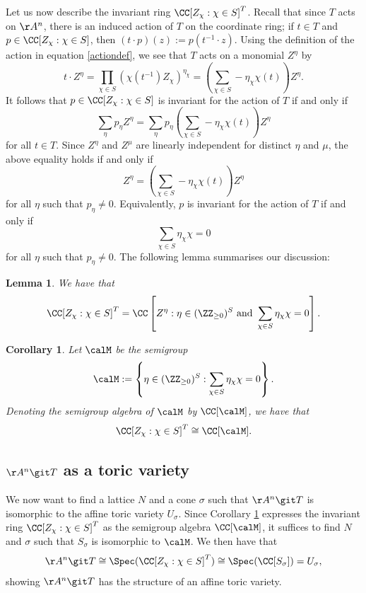 \documentclass[12pt]{amsart}
\theoremstyle{plain}
\newtheorem{corollary}[theorem]{Corollary}
\newtheorem{lemma}[theorem]{Lemma}
\begin{document}
Let us now describe the invariant ring $\CC[Z_\chi : \chi \in S]^T$.
Recall that since $T$ acts on $\AA^n$, there is an induced action of $T$ on the coordinate ring;
if $t \in T$ and $p \in \CC[Z_\chi : \chi \in S]$, then $(t\cdot p)(z) := p(t^{-1} \cdot z)$.
Using the definition of the action in equation \ref{actiondef}, we see that $T$ acts on a monomial $Z^\eta$ by
$$t \cdot Z^\eta = \prod_{\chi \in S} (\chi(t^{-1}) Z_\chi)^{\eta_\chi} = \left(\sum_{\chi \in S} - \eta_\chi \chi(t)\right) Z^\eta.$$
It follows that $p \in \CC[Z_\chi : \chi \in S]$ is invariant for the action of $T$ if and only if
$$\sum_\eta p_\eta Z^\eta = \sum_\eta p_\eta \left( \sum_{\chi \in S} - \eta_\chi \chi(t)\right) Z^\eta$$
for all $t \in T$.
Since $Z^\eta$ and $Z^\mu$ are linearly independent for distinct $\eta$ and $\mu$, the above equality holds if and only if 
$$Z^\eta = \left(\sum_{\chi \in S} - \eta_\chi \chi(t)\right) Z^\eta$$
for all $\eta$ such that $p_\eta \ne 0$.
Equivalently, $p$ is invariant for the action of $T$ if and only if
$$\sum_{\chi \in S} \eta_\chi \chi = 0$$
for all $\eta$ such that $p_\eta \ne 0$.
The following lemma summarises our discussion:

\begin{lemma}
We have that 
$$\CC[Z_\chi : \chi \in S]^T = \CC\left[Z^\eta : \eta \in (\ZZ_{\ge 0})^S \text{ and }\sum_{\chi \in S} \eta_\chi \chi = 0\right].$$
\end{lemma}
\begin{corollary}\label{invariantringsemigroupalgebra}
Let $\calM$ be the semigroup 
$$\calM := \left\{ \eta \in (\ZZ_{\ge 0})^S : \sum_{\chi \in S} \eta_\chi \chi = 0\right\}.$$
Denoting the semigroup algebra of $\calM$ by $\CC[\calM]$, we have that
$$\CC[Z_\chi : \chi \in S]^T \cong \CC[\calM].$$
\end{corollary}

\subsection{$\AA^n \git T$ as a toric variety}
We now want to find a lattice $N$ and a cone $\sigma$ such that $\AA^n \git T$ is isomorphic to the affine toric variety $U_\sigma$.
Since Corollary \ref{invariantringsemigroupalgebra} expresses the invariant ring $\CC[Z_\chi : \chi \in S]^T$ as the semigroup algebra $\CC[\calM]$, it suffices to find $N$ and $\sigma$ such that $S_\sigma$ is isomorphic to $\calM$.
We then have that
$$\AA^n \git T \cong \Spec(\CC[Z_\chi : \chi \in S]^T) \cong \Spec(\CC[S_\sigma]) = U_\sigma,$$
showing $\AA^n \git T$ has the structure of an affine toric variety.
\end{document}

